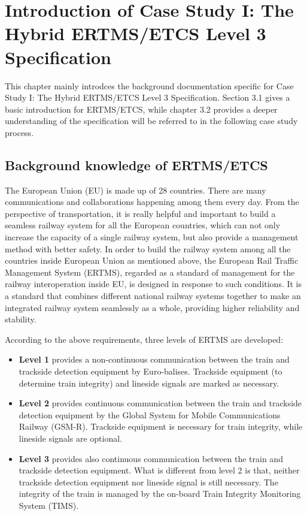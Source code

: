 \documentclass[article,dr=phil,type=msc,colorback,accentcolor=tud9c]{tudthesis}
\begin{document}
  \section{Introduction of Case Study I: The Hybrid ERTMS/ETCS Level 3 Specification}
  
  This chapter mainly introdces the background documentation specific for Case Study I: The Hybrid ERTMS/ETCS Level 3 Specification. Section 3.1 gives a basic introduction for ERTMS/ETCS, while chapter 3.2 provides a deeper understanding of the specification will be referred to in the following case study process.
 
  \subsection{Background knowledge of ERTMS/ETCS}
  
  The European Union (EU) is made up of 28 countries. There are many communications and collaborations happening among them every day. From the perspective of transportation, it is really helpful and important to build a seamless railway system for all the European countries, which can not only increase the capacity of a single railway system, but also provide a management method with better safety. In order to build the railway system among all the countries inside European Union as mentioned above, the European Rail Traffic Management System (ERTMS), regarded as a standard of management for the railway interoperation inside EU, is designed in response to such conditions. It is a standard that combines different national railway systems together to make an integrated railway system seamlessly as a whole, providing higher reliability and stability.
  
  According to the above requirements, three levels of ERTMS are developed:
  
  \begin{itemize}
  	
  \item \textbf{Level 1} provides a non-continuous communication between the train and trackside detection equipment by Euro-balises. Trackside equipment (to determine train integrity) and lineside signals are marked as necessary.
  
  \item \textbf{Level 2} provides continuous communication between the train and trackside detection equipment by the Global System for Mobile Communications Railway (GSM-R). Trackside equipment is necessary for train integrity, while lineside signals are optional.
  
  \item \textbf{Level 3} provides also continuous communication between the train and trackside detection equipment. What is different from level 2 is that, neither trackside detection equipment nor lineside signal is still necessary. The integrity of the train is managed by the on-board Train Integrity Monitoring System (TIMS).  \cite{ertmsnet, eceuropaeu}
  
  \end{itemize}
  
\end{document}
